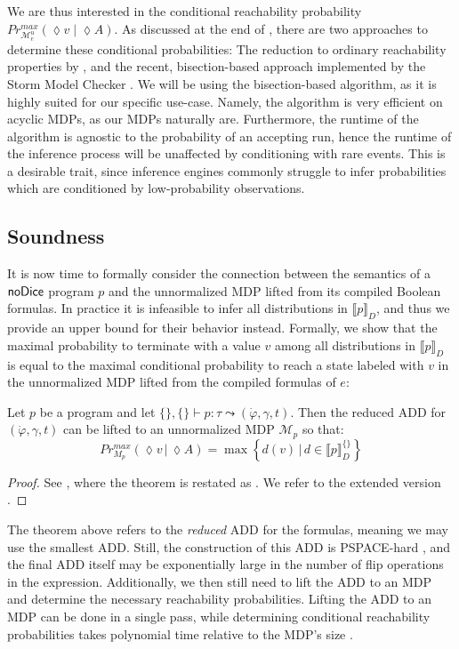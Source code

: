 We are thus interested in the conditional reachability probability $Pr^{max}_{\mathcal{M}^u_e} (\lozenge v \;|\; \lozenge A)$.
As discussed at the end of , there are two approaches to determine these conditional probabilities:
The reduction to ordinary reachability properties by \citet{baier2014computing}, and the recent, bisection-based approach implemented by the Storm Model Checker \citeBisection.
We will be using the bisection-based algorithm, as it is highly suited for our specific use-case.
Namely, the algorithm is very efficient on acyclic MDPs, as our MDPs naturally are.
Furthermore, the runtime of the algorithm is agnostic to the probability of an accepting run, hence the runtime of the inference process will be unaffected by conditioning with rare events.
This is a desirable trait, since inference engines commonly struggle to infer probabilities which are conditioned by low-probability observations.


 
 \subsection{Soundness}
 It is now time to formally consider the connection between the semantics of a $\textsf{\upshape {\mbox{noDice}}}$ program $p$ and the unnormalized MDP lifted from its compiled Boolean formulas.
 In practice it is infeasible to infer all distributions in $\llbracket p \rrbracket_D$, and thus we provide an upper bound for their behavior instead.
 Formally, we show that the maximal probability to terminate with a value $v$ among all distributions in $\llbracket p \rrbracket_D$ is equal to the maximal conditional probability to reach a state labeled with $v$ in the unnormalized MDP lifted from the compiled formulas of $e$:

\begin{theorem}\label{ProgramSoundness}
	Let $p$ be a \NDICE program  
	and let $\{\}, \{\} \vdash p \colon \tau \leadsto (\dot{\varphi}, \gamma, t)$. 
	Then the reduced ADD for $(\dot{\varphi}, \gamma, t)$ can be lifted to an unnormalized MDP $\mathcal{M}_p$ so that:
	$$ Pr^{max}_{M_p} (\lozenge v \,|\, \lozenge A) = \max \left\{d(v) \,|\, d \in \llbracket p\rrbracket^{\{\}}_D\right\}$$
\end{theorem}
\begin{proof}
	 \ext
	 {See , where the theorem is restated as .}
	 {We refer to the extended version \citeExtended.}
\end{proof}
%
%
\noindent%
%
%
The theorem above refers to the \textit{reduced} ADD for the formulas, meaning we may use the smallest ADD.
Still, the construction of this ADD is PSPACE-hard \cite{holtzen2020scaling}, and the final ADD itself may be exponentially large in the number of flip operations in the expression.
Additionally, we then still need to lift the ADD to an MDP and determine the necessary reachability probabilities.
Lifting the ADD to an MDP can be done in a single pass, while determining conditional reachability probabilities takes polynomial time relative to the MDP's size \cite{puterman2014markov, baier2014computing}.

